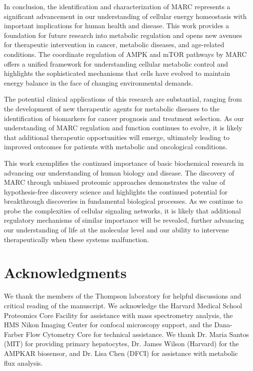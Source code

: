 \documentclass[11pt,a4paper]{article}
\begin{document}
In conclusion, the identification and characterization of MARC represents a significant advancement in our understanding of cellular energy homeostasis with important implications for human health and disease. This work provides a foundation for future research into metabolic regulation and opens new avenues for therapeutic intervention in cancer, metabolic diseases, and age-related conditions. The coordinate regulation of AMPK and mTOR pathways by MARC offers a unified framework for understanding cellular metabolic control and highlights the sophisticated mechanisms that cells have evolved to maintain energy balance in the face of changing environmental demands.

The potential clinical applications of this research are substantial, ranging from the development of new therapeutic agents for metabolic diseases to the identification of biomarkers for cancer prognosis and treatment selection. As our understanding of MARC regulation and function continues to evolve, it is likely that additional therapeutic opportunities will emerge, ultimately leading to improved outcomes for patients with metabolic and oncological conditions.

This work exemplifies the continued importance of basic biochemical research in advancing our understanding of human biology and disease. The discovery of MARC through unbiased proteomic approaches demonstrates the value of hypothesis-free discovery science and highlights the continued potential for breakthrough discoveries in fundamental biological processes. As we continue to probe the complexities of cellular signaling networks, it is likely that additional regulatory mechanisms of similar importance will be revealed, further advancing our understanding of life at the molecular level and our ability to intervene therapeutically when these systems malfunction.

\section*{Acknowledgments}

We thank the members of the Thompson laboratory for helpful discussions and critical reading of the manuscript. We acknowledge the Harvard Medical School Proteomics Core Facility for assistance with mass spectrometry analysis, the HMS Nikon Imaging Center for confocal microscopy support, and the Dana-Farber Flow Cytometry Core for technical assistance. We thank Dr. Maria Santos (MIT) for providing primary hepatocytes, Dr. James Wilson (Harvard) for the AMPKAR biosensor, and Dr. Lisa Chen (DFCI) for assistance with metabolic flux analysis.
\end{document}
